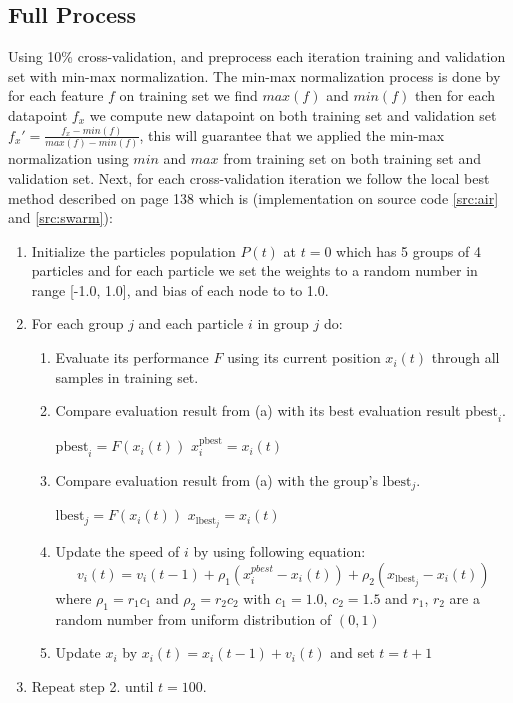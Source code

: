 \documentclass{article}
\begin{document}
\subsection*{Full Process}
Using 10\% cross-validation, and preprocess each iteration training and validation set with min-max normalization. The min-max 
normalization process is done by for each feature $f$ on training set we find $max(f)$ and $min(f)$ then for each datapoint $f_x$
we compute new datapoint on both training set and validation set $f_x' = \frac{f_x - min(f)}{max(f) - min(f)}$, this will guarantee
that we applied the min-max normalization using $min$ and $max$ from training set on both training set and validation set. Next, for  
each cross-validation iteration we follow the local best method described on \cite{sansanee} page 138 which is 
(implementation on source code \ref{src:air} and \ref{src:swarm}):
\begin{enumerate}
    \item {Initialize the particles population $P(t)$ at $t = 0$ which has 5 groups of 4 particles and 
    for each particle we set the weights to a random number in range [-1.0, 1.0], and bias of each node to to 1.0.
    }
    \item {For each group $j$ and each particle $i$ in group $j$ do:
        \begin{enumerate}
            \item Evaluate its performance $F$ using its current position $x_i(t)$ through all samples in training set.
            \item {Compare evaluation result from (a) with its best evaluation result $\text{pbest}_i$.
                \begin{algorithmic}
                        \State $\text{pbest}_i = F(x_i(t))$ 
                        \State $x_i^{\text{pbest}} = x_i(t)$
                    \EndIf
                \end{algorithmic}
                }  
            \item {Compare evaluation result from (a) with the group's $\text{lbest}_j$.
                \begin{algorithmic}
                        \State $\text{lbest}_j = F(x_i(t))$ 
                        \State $x_{\text{lbest}_j} = x_i(t)$
                    \EndIf
                \end{algorithmic}
                }
            \item {Update the speed of $i$ by using following equation:
            $$
                v_i(t) = v_i(t-1) + \rho_1(x_i^{pbest} - x_i(t)) + \rho_2(x_{\text{lbest}_j} - x_i(t))
            $$
            where $\rho_1 = r_1c_1$ and $\rho_2 = r_2c_2$  with $c_1 = 1.0$, $c_2 = 1.5$ and $r_1$, $r_2$ are a random 
            number from uniform distribution of $(0, 1)$
            }
            \item {Update $x_i$ by $x_i(t) = x_i(t - 1) + v_i(t)$ and set $t = t + 1$} 
        \end{enumerate}}
    \item Repeat step 2. until $t = 100$.
\end{enumerate}
\end{document}
